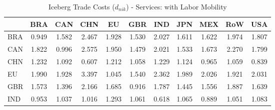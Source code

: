 \begin{table}[htbp]
\centering
\caption{Iceberg Trade Costs ($d_{nik}$) - Services: with Labor Mobility} 
\label{tab:iceberg_Services}
\begin{tabular}{lcccccccccc}
  \hline
 & BRA & CAN & CHN & EU & GBR & IND & JPN & MEX & RoW & USA \\ 
  \hline
BRA & \textcolor[RGB]{237,153,18}{0.949} & \textcolor[RGB]{145,94,110}{1.582} & \textcolor[RGB]{8,5,247}{2.467} & \textcolor[RGB]{79,51,176}{1.928} & \textcolor[RGB]{163,106,92}{1.530} & \textcolor[RGB]{51,33,204}{2.027} & \textcolor[RGB]{140,91,115}{1.611} & \textcolor[RGB]{138,89,117}{1.622} & \textcolor[RGB]{69,45,186}{1.974} & \textcolor[RGB]{105,68,150}{1.807} \\ 
  CAN & \textcolor[RGB]{99,64,156}{1.822} & \textcolor[RGB]{227,147,28}{0.996} & \textcolor[RGB]{5,3,250}{2.575} & \textcolor[RGB]{74,48,181}{1.950} & \textcolor[RGB]{166,107,89}{1.479} & \textcolor[RGB]{56,36,199}{2.021} & \textcolor[RGB]{161,104,94}{1.533} & \textcolor[RGB]{133,86,122}{1.673} & \textcolor[RGB]{25,16,230}{2.270} & \textcolor[RGB]{107,69,148}{1.799} \\ 
  CHN & \textcolor[RGB]{184,119,71}{1.232} & \textcolor[RGB]{199,129,56}{1.092} & \textcolor[RGB]{252,163,3}{0.607} & \textcolor[RGB]{191,124,64}{1.212} & \textcolor[RGB]{214,139,41}{1.058} & \textcolor[RGB]{186,120,69}{1.229} & \textcolor[RGB]{196,127,59}{1.124} & \textcolor[RGB]{230,148,26}{0.965} & \textcolor[RGB]{212,137,43}{1.059} & \textcolor[RGB]{247,160,8}{0.839} \\ 
  EU & \textcolor[RGB]{61,40,194}{1.990} & \textcolor[RGB]{82,53,173}{1.928} & \textcolor[RGB]{0,0,255}{3.397} & \textcolor[RGB]{219,142,36}{1.045} & \textcolor[RGB]{158,102,97}{1.540} & \textcolor[RGB]{15,10,240}{2.362} & \textcolor[RGB]{64,41,191}{1.989} & \textcolor[RGB]{54,35,201}{2.026} & \textcolor[RGB]{87,56,168}{1.921} & \textcolor[RGB]{48,31,207}{2.031} \\ 
  GBR & \textcolor[RGB]{148,96,107}{1.573} & \textcolor[RGB]{171,111,84}{1.396} & \textcolor[RGB]{38,25,217}{2.166} & \textcolor[RGB]{130,84,125}{1.685} & \textcolor[RGB]{240,155,15}{0.916} & \textcolor[RGB]{110,71,145}{1.787} & \textcolor[RGB]{168,109,87}{1.445} & \textcolor[RGB]{150,97,105}{1.556} & \textcolor[RGB]{89,58,166}{1.887} & \textcolor[RGB]{135,87,120}{1.639} \\ 
  IND & \textcolor[RGB]{235,152,20}{0.953} & \textcolor[RGB]{222,144,33}{1.037} & \textcolor[RGB]{224,145,31}{1.016} & \textcolor[RGB]{178,115,76}{1.293} & \textcolor[RGB]{209,135,46}{1.061} & \textcolor[RGB]{250,162,5}{0.618} & \textcolor[RGB]{207,134,48}{1.065} & \textcolor[RGB]{242,157,13}{0.889} & \textcolor[RGB]{217,140,38}{1.051} & \textcolor[RGB]{201,130,54}{1.083} \\ 

\end{tabular}
\end{table}

